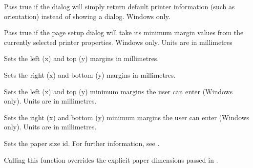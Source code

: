 
Pass true if the dialog will simply return default printer information (such as orientation)
instead of showing a dialog. Windows only.

\label{wxpagesetupdialogdatasetdefaultminmargins}


Pass true if the page setup dialog will take its minimum margin values from the currently
selected printer properties. Windows only. Units are in millimetres

\label{wxpagesetupdialogdatasetmargintopleft}


Sets the left (x) and top (y) margins in millimetres.

\label{wxpagesetupdialogdatasetmarginbottomright}


Sets the right (x) and bottom (y) margins in millimetres.

\label{wxpagesetupdialogdatasetminmargintopleft}


Sets the left (x) and top (y) minimum margins the user can enter (Windows only). Units are
in millimetres.

\label{wxpagesetupdialogdatasetminmarginbottomright}


Sets the right (x) and bottom (y) minimum margins the user can enter (Windows only). Units are
in millimetres.

\label{wxpagesetupdialogdatasetpaperid}


Sets the paper size id. For further information, see .

Calling this function overrides the explicit paper dimensions passed in .

